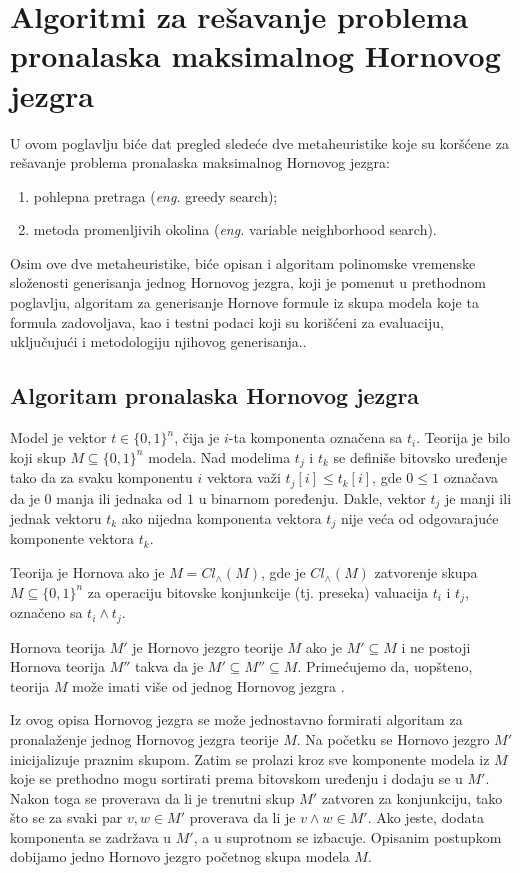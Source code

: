 \documentclass[12pt,oneside]{memoir}
\begin{document}
\chapter{Algoritmi za rešavanje problema pronalaska maksimalnog Hornovog jezgra}
U ovom poglavlju biće dat pregled sledeće dve metaheuristike koje su koršćene za rešavanje problema pronalaska maksimalnog Hornovog jezgra:
\label{chap:chapter2}

\begin{enumerate}
  \item pohlepna pretraga (\textit{eng.} greedy search);
  \item metoda promenljivih okolina (\textit{eng.} variable neighborhood search).
\end{enumerate}
Osim ove dve metaheuristike, biće opisan i algoritam polinomske vremenske složenosti generisanja jednog Hornovog jezgra, koji je pomenut u prethodnom poglavlju, algoritam za generisanje Hornove formule iz skupa modela koje ta formula zadovoljava, kao i testni podaci koji su korišćeni za evaluaciju, uključujući i metodologiju njihovog generisanja..

\section{Algoritam pronalaska Hornovog jezgra}

Model je vektor $t \in \{0,1\}^n$, čija je $i$-ta komponenta označena sa $t_i$. Teorija je bilo koji skup $M \subseteq \{0,1\}^n$ modela. Nad modelima $t_j$ i $t_k$ se definiše bitovsko uređenje tako da za svaku komponentu $i$ vektora važi $t_j[i] \leq t_k[i]$, gde $0 \leq 1$ označava da je $0$ manja ili jednaka od $1$ u binarnom poređenju. Dakle, vektor $t_j$ je manji ili jednak vektoru $t_k$ ako nijedna komponenta vektora $t_j$ nije veća od odgovarajuće komponente vektora $t_k$.

Teorija je Hornova ako je $M = Cl_{\land}(M)$, gde je $Cl_{\land}(M)$ zatvorenje skupa $M \subseteq \{0,1\}^n$ za operaciju bitovske konjunkcije (tj. preseka) valuacija $t_i$ i $t_j$, označeno sa $t_i \land t_j$.

Hornova teorija $M'$ je Hornovo jezgro teorije $M$ ako je $M' \subseteq M$ i ne postoji Hornova teorija $M''$ takva da je $M' \subseteq M'' \subseteq M$. Primećujemo da, uopšteno, teorija $M$ može imati više od jednog Hornovog jezgra \cite{doc1}.

Iz ovog opisa Hornovog jezgra se može jednostavno formirati algoritam za pronalaženje jednog Hornovog jezgra teorije $M$. Na početku se Hornovo jezgro $M'$ inicijalizuje praznim skupom. Zatim se prolazi kroz sve komponente modela iz $M$ koje se prethodno mogu sortirati prema bitovskom uređenju i dodaju se u $M'$. Nakon toga se proverava da li je trenutni skup $M'$ zatvoren za konjunkciju, tako što se za svaki par $v, w \in M'$ proverava da li je $v \land w \in M'$. Ako jeste, dodata komponenta se zadržava u $M'$, a u suprotnom se izbacuje. Opisanim postupkom dobijamo jedno Hornovo jezgro početnog skupa modela $M$.\\
\end{document}
